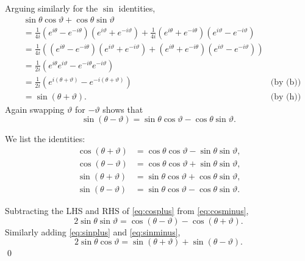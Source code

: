 \documentclass[oneside]{article}
\begin{document}
\begin{enumerate}[label=\textbf{(\alph*)}]
    Arguing similarly for the $\sin$ identities,\begin{align*}
      &\sin\theta\cos\vartheta + \cos\theta\sin\vartheta \\
      &= \frac1{4i}
        \left(e^{i\theta} - e^{-i\theta}\right)
        \left(e^{i\vartheta} + e^{-i\vartheta}\right)
        + \frac1{4i}
        \left(e^{i\theta} + e^{-i\theta}\right)
        \left(e^{i\vartheta} - e^{-i\vartheta}\right) \\
      &= \frac1{4i}\left(
        \left(e^{i\theta} - e^{-i\theta}\right)
        \left(e^{i\vartheta} + e^{-i\vartheta}\right)
        + \left(e^{i\theta} + e^{-i\theta}\right)
        \left(e^{i\vartheta} - e^{-i\vartheta}\right)\right) \\
      &= \frac1{2i}\left(
        e^{i\theta}e^{i\vartheta}
        - e^{-i\theta}e^{-i\vartheta}
        \right) \\
      &= \frac1{2i}\left(
        e^{i(\theta + \vartheta)} - e^{-i(\theta + \vartheta)}
        \right)  & \text{(by (b))} \\
      &= \sin(\theta + \vartheta) \text{.} & \text{(by (h))}
    \end{align*} Again swapping $\vartheta$ for $-\vartheta$ shows that \[
      \sin(\theta  - \vartheta)
      = \sin\theta\cos\vartheta - \cos\theta\sin\vartheta \text{.}
    \]

    We list the identities:\begin{align}
      \cos(\theta + \vartheta)
        &= \cos\theta\cos\vartheta
        - \sin\theta\sin\vartheta\text{,} \label{eq:cosplus} \\
      \cos(\theta - \vartheta)
        &= \cos\theta\cos\vartheta
        + \sin\theta\sin\vartheta\text{,} \label{eq:cosminus} \\
      \sin(\theta + \vartheta)
        &= \sin\theta\cos\vartheta
        + \cos\theta\sin\vartheta\text{,} \label{eq:sinplus} \\
      \sin(\theta - \vartheta)
        &= \sin\theta\cos\vartheta
        - \cos\theta\sin\vartheta\text{.} \label{eq:sinminus}
    \end{align}

    Subtracting the LHS and RHS of \eqref{eq:cosplus} from \eqref{eq:cosminus},
    \[
      2\sin\theta\sin\vartheta
      = \cos(\theta - \vartheta) - \cos(\theta + \vartheta) \text{.}
    \] Similarly adding \eqref{eq:sinplus} and \eqref{eq:sinminus},\[
      2\sin\theta\cos\vartheta
      = \sin(\theta + \vartheta) + \sin(\theta - \vartheta) \text{.}
    \]\qed

  \end{enumerate}
\end{document}
